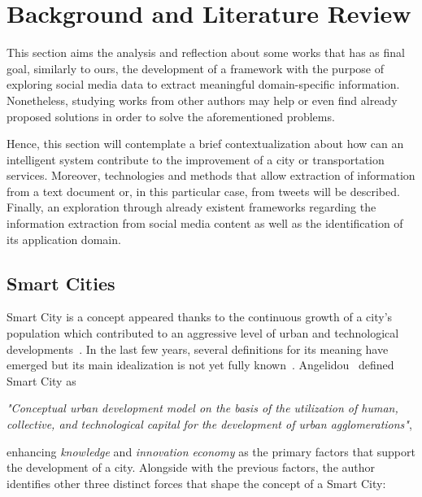 \chapter{Background and Literature Review} \label{chap:sota}

\minitoc \mtcskip \noindent

This section aims the analysis and reflection about some works that has as final goal, similarly to ours, the development of a framework with the purpose of exploring social media data to extract meaningful domain-specific information. Nonetheless, studying works from other authors may help or even find already proposed solutions in order to solve the aforementioned problems.

Hence, this section will contemplate a brief contextualization about how can an intelligent system contribute to the improvement of a city or transportation services. Moreover, technologies and methods that allow extraction of information from a text document or, in this particular case, from tweets will be described. Finally, an exploration through already existent frameworks regarding the information extraction from social media content as well as the identification of its application domain.

\section{Smart Cities}\label{sec:smart_cities}

Smart City is a concept appeared thanks to the continuous growth of a city's population which contributed to an aggressive level of urban and technological developments~\cite{ulloa2016mining}. In the last few years, several definitions for its meaning have emerged but its main idealization is not yet fully known~\cite{kn:Komninos2009}. Angelidou~\cite{kn:Angelidou2015} defined Smart City as

\emph{"Conceptual urban development model on the basis of the utilization of human, collective, and technological capital for the development of urban agglomerations"},

enhancing \textit{knowledge} and \textit{innovation economy} as the primary factors that support the development of a city. Alongside with the previous factors, the author identifies other three distinct forces that shape the concept of a Smart City:

